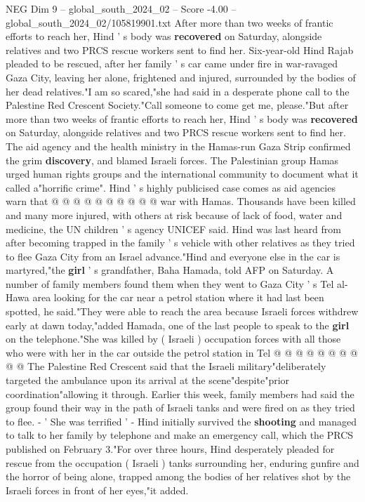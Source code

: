 \begin{textsample}{NEG Dim 9 – global\_south\_2024\_02 – Score -4.00 – global\_south\_2024\_02/105819901.txt}  \label{ex:f9_neg_349}
After more than two weeks of frantic efforts to reach her, Hind ' s body was \textbf{recovered} on Saturday, alongside relatives and two PRCS rescue workers sent to find her.
Six-year-old Hind Rajab pleaded to be rescued, after her family ' s car came under fire in war-ravaged Gaza City, leaving her alone, frightened and injured, surrounded by the bodies of her dead relatives."I am so scared,"she had said in a desperate phone call to the Palestine Red Crescent Society."Call someone to come get me, please."But after more than two weeks of frantic efforts to reach her, Hind ' s body was \textbf{recovered} on Saturday, alongside relatives and two PRCS rescue workers sent to find her.
The aid agency and the health ministry in the Hamas-run Gaza Strip confirmed the grim \textbf{discovery}, and blamed Israeli forces.
The Palestinian group Hamas urged human rights groups and the international community to document what it called a"horrific crime".
Hind ' s highly publicised case comes as aid agencies warn that @ @ @ @ @ @ @ @ @ @ war with Hamas.
Thousands have been killed and many more injured, with others at risk because of lack of food, water and medicine, the UN children ' s agency UNICEF said.
Hind was last heard from after becoming trapped in the family ' s vehicle with other relatives as they tried to flee Gaza City from an Israel advance."Hind and everyone else in the car is martyred,"the \textbf{girl} ' s grandfather, Baha Hamada, told AFP on Saturday.
A number of family members found them when they went to Gaza City ' s Tel al-Hawa area looking for the car near a petrol station where it had last been spotted, he said."They were able to reach the area because Israeli forces withdrew early at dawn today,"added Hamada, one of the last people to speak to the \textbf{girl} on the telephone."She was killed by ( Israeli ) occupation forces with all those who were with her in the car outside the petrol station in Tel @ @ @ @ @ @ @ @ @ @ The Palestine Red Crescent said that the Israeli military"deliberately targeted the ambulance upon its arrival at the scene"despite"prior coordination"allowing it through.
Earlier this week, family members had said the group found their way in the path of Israeli tanks and were fired on as they tried to flee. - ' She was terrified ' - Hind initially survived the \textbf{shooting} and managed to talk to her family by telephone and make an emergency call, which the PRCS published on February 3."For over three hours, Hind desperately pleaded for rescue from the occupation ( Israeli ) tanks surrounding her, enduring gunfire and the horror of being alone, trapped among the bodies of her relatives shot by the Israeli forces in front of her eyes,"it added.

\end{textsample}

